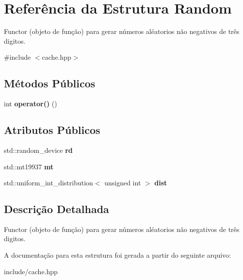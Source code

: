 \hypertarget{structRandom}{}\section{Referência da Estrutura Random}
\label{structRandom}


Functor (objeto de função) para gerar números aléatorios não negativos de três digitos.  




{\ttfamily \#include $<$cache.\+hpp$>$}

\subsection*{Métodos Públicos}
\begin{DoxyCompactItemize}
\item 
\mbox{\label{structRandom_adcf65dea31f990d9d7ec536fed7aa6ca}} 
int {\bfseries operator()} ()
\end{DoxyCompactItemize}
\subsection*{Atributos Públicos}
\begin{DoxyCompactItemize}
\item 
\mbox{\label{structRandom_a7206399225b174d8a582fbe005fdd147}} 
std\+::random\+\_\+device {\bfseries rd}
\item 
\mbox{\label{structRandom_aa4354db31fa7d64040939b905ab12ee1}} 
std\+::mt19937 {\bfseries mt}
\item 
\mbox{\label{structRandom_a526c9d413a18965b3075bfcc23c28dcb}} 
std\+::uniform\+\_\+int\+\_\+distribution$<$ unsigned int $>$ {\bfseries dist}
\end{DoxyCompactItemize}


\subsection{Descrição Detalhada}
Functor (objeto de função) para gerar números aléatorios não negativos de três digitos. 

A documentação para esta estrutura foi gerada a partir do seguinte arquivo\+:\begin{DoxyCompactItemize}
\item 
include/cache.\+hpp\end{DoxyCompactItemize}
